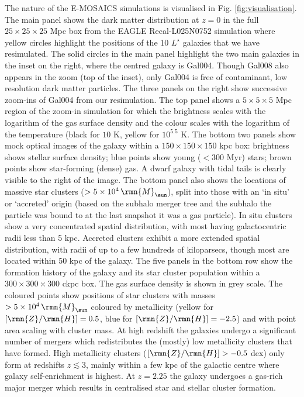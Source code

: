 \documentclass[fleqn,usenatbib]{mnras}
\newcommand\Msun{\,\rmn{M}_{\sun}}
\newcommand\ZH{\lbrack \rmn{Z}/\rmn{H} \rbrack}
\begin{document}
The nature of the E-MOSAICS simulations is visualised in Fig. \ref{fig:visualisation}. The main panel shows the dark matter distribution at $z=0$ in the full $25\times25\times25$ Mpc box from the EAGLE Recal-L025N0752 simulation where yellow circles highlight the positions of the 10 $L^\star$ galaxies that we have resimulated. 
The solid circles in the main panel highlight the two main galaxies in the inset on the right, where the centred galaxy is Gal004. Though Gal008 also appears in the zoom (top of the inset), only Gal004 is free of contaminant, low resolution dark matter particles.
The three panels on the right show successive zoom-ins of Gal004 from our resimulation. The top panel shows a $5\times5\times5$ Mpc region of the zoom-in simulation for which the brightness scales with the logarithm of the gas surface density and the colour scales with the logarithm of the temperature (black for $10$ K, yellow for $10^{5.5}$ K. The bottom two panels show mock optical images of the galaxy within a $150\times150\times150$ kpc box: brightness shows stellar surface density; blue points show young ($<300$ Myr) stars; brown points show star-forming (dense) gas. A dwarf galaxy with tidal tails is clearly visible to the right of the image.
The bottom panel also shows the locations of massive star clusters ($>5\times10^4 \Msun$), split into those with an `in situ' or `accreted' origin (based on the subhalo merger tree and the subhalo the particle was bound to at the last snapshot it was a gas particle). In situ clusters show a very concentrated spatial distribution, with most having galactocentric radii less than 5 kpc. Accreted clusters exhibit a more extended spatial distribution, with radii of up to a few hundreds of kiloparsecs, though most are located within 50 kpc of the galaxy.
The five panels in the bottom row show the formation history of the galaxy and its star cluster population within a $300\times300\times300$ ckpc box. The gas surface density is shown in grey scale. The coloured points show positions of star clusters with masses $>5\times10^4 \Msun$ coloured by metallicity (yellow for $\ZH=0.5$, blue for $\ZH=-2.5$) and with point area scaling with cluster mass.
At high redshift the galaxies undergo a significant number of mergers which redistributes the (mostly) low metallicity clusters that have formed. High metallicity clusters ($\ZH > -0.5$ dex) only form at redshifts $z\lesssim3$, mainly within a few kpc of the galactic centre where galaxy self-enrichment is highest. 
At $z=2.25$ the galaxy undergoes a gas-rich major merger which results in centralised star and stellar cluster formation.
\end{document}

